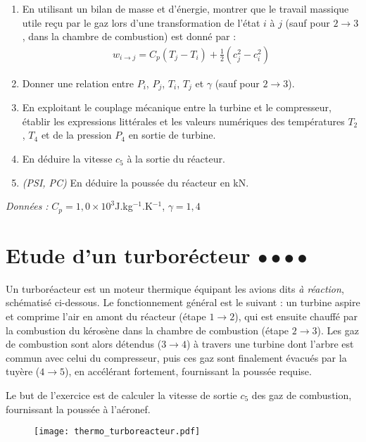 \begin{enumerate}

	\item En utilisant un bilan de masse et d'énergie, montrer que le travail massique utile reçu par le gaz lors d'une transformation de l'état $i$ à $j$ (sauf pour $2\rightarrow3$, dans la chambre de combustion) est donné par :
	\begin{align*}
		w_{i\rightarrow j}=C_p(T_j-T_i) + \frac{1}{2}\left(c_j^2-c_i^2 \right) 
	\end{align*}
	\item Donner une relation entre $P_i$, $P_j$, $T_i$, $T_j$ et $\gamma$ (sauf pour $2\rightarrow3$).
	\item En exploitant le couplage mécanique entre la turbine et le compresseur, établir les expressions littérales et les valeurs numériques des températures $T_2$, $T_4$ et de la pression $P_4$ en sortie de turbine.
	\item En déduire la vitesse $c_5$ à la sortie du réacteur. 
	\item \textit{(PSI, PC)} En déduire la poussée du réacteur en kN.

\end{enumerate}

\textit{Données :} $C_p=1,0\times10^3$J.kg$^{-1}$.K$^{-1}$, $\gamma=1,4$

\newpage

\section{Etude d'un turborécteur $\bullet\bullet\bullet\bullet$}

Un turboréacteur est un moteur thermique équipant les avions dits \textit{à réaction}, schématisé ci-dessous. Le fonctionnement général est le suivant : un turbine aspire et comprime l'air en amont du réacteur (étape $1\rightarrow2$), qui est ensuite chauffé par la combustion du kérosène dans la chambre de combustion (étape $2\rightarrow3$). Les gaz de combustion sont alors détendus ($3\rightarrow4$) à travers une turbine dont l'arbre est commun avec celui du compresseur, puis ces gaz sont finalement évacués par la tuyère ($4\rightarrow5$), en accélérant fortement, fournissant la poussée requise.

Le but de l'exercice est de calculer la vitesse de sortie $c_5$ des gaz de combustion, fournissant la poussée à l'aéronef.

\begin{figure}[!h]
\centering
	\texttt{[image: thermo\_turboreacteur.pdf]}
\end{figure}

